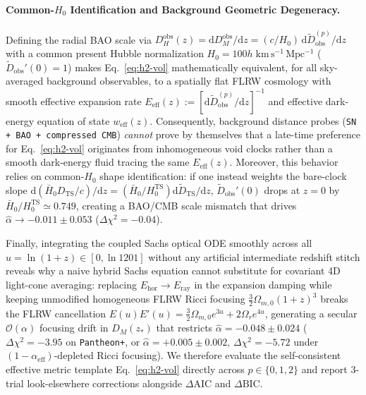 \documentclass[11pt,a4paper]{article}
\begin{document}
\paragraph{Common-$H_0$ Identification and Background Geometric Degeneracy.} Defining the radial BAO scale via $D_H^{\mathrm{obs}}(z) = \mathrm{d}D_M^{\mathrm{obs}}/\mathrm{d}z = (c/H_0)\,\mathrm{d}\widetilde{D}_{\mathrm{obs}}^{(p)}/\mathrm{d}z$ with a common present Hubble normalization $H_0 = 100h\;\mathrm{km\,s^{-1}\,Mpc^{-1}}$ ($\widetilde{D}_{\mathrm{obs}}'(0) = 1$) makes Eq.~\eqref{eq:h2-vol} mathematically equivalent, for all sky-averaged background observables, to a spatially flat FLRW cosmology with smooth effective expansion rate $E_{\mathrm{eff}}(z) := [\mathrm{d}\widetilde{D}_{\mathrm{obs}}^{(p)}/\mathrm{d}z]^{-1}$ and effective dark-energy equation of state $w_{\mathrm{eff}}(z)$. Consequently, background distance probes (\texttt{SN + BAO + compressed CMB}) \textit{cannot} prove by themselves that a late-time preference for Eq.~\eqref{eq:h2-vol} originates from inhomogeneous void clocks rather than a smooth dark-energy fluid tracing the same $E_{\mathrm{eff}}(z)$. Moreover, this behavior relies on common-$H_0$ shape identification: if one instead weights the bare-clock slope $\mathrm{d}(\bar{H}_0 D_{\mathrm{TS}}/c)/\mathrm{d}z = (\bar{H}_0/H_0^{\mathrm{TS}})\mathrm{d}\widetilde{D}_{\mathrm{TS}}/\mathrm{d}z$, $\widetilde{D}_{\mathrm{obs}}'(0)$ drops at $z = 0$ by $\bar{H}_0/H_0^{\mathrm{TS}} \simeq 0.749$, creating a BAO/CMB scale mismatch that drives $\hat{\alpha} \to -0.011 \pm 0.053$ ($\Delta\chi^2 = -0.04$).

Finally, integrating the coupled Sachs optical ODE smoothly across all $u = \ln(1+z) \in [0, \ln 1201]$ without any artificial intermediate redshift stitch reveals why a naive hybrid Sachs equation cannot substitute for covariant 4D light-cone averaging: replacing $E_{\mathrm{hor}} \to E_{\mathrm{ray}}$ in the expansion damping while keeping unmodified homogeneous FLRW Ricci focusing $\frac{3}{2}\Omega_{m,0}(1+z)^3$ breaks the FLRW cancellation $E(u)E'(u) = \frac{3}{2}\Omega_{m,0}e^{3u} + 2\Omega_r e^{4u}$, generating a secular $\mathcal{O}(\alpha)$ focusing drift in $D_M(z_*)$ that restricts $\hat{\alpha} = -0.048 \pm 0.024$ ($\Delta\chi^2 = -3.95$ on \texttt{Pantheon+}, or $\hat{\alpha} = +0.005 \pm 0.002$, $\Delta\chi^2 = -5.72$ under $(1-\alpha_{\mathrm{eff}})$-depleted Ricci focusing). We therefore evaluate the self-consistent effective metric template Eq.~\eqref{eq:h2-vol} directly across $p \in \{0, 1, 2\}$ and report $3$-trial look-elsewhere corrections alongside $\Delta\mathrm{AIC}$ and $\Delta\mathrm{BIC}$.
\end{document}
